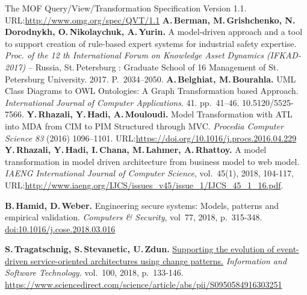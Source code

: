 \documentclass[runningheads]{llncs}
\begin{document}
\begin{thebibliography}{11}
 The MOF Query/View/Transformation Specification Version 1.1. URL:\url{http://www.omg.org/spec/QVT/1.1}
 \textbf{A.\,Berman, M.\,Grishchenko, N.\,Dorodnykh, O.\,Nikolaychuk, A.\,Yurin.} A model-driven approach and a tool to support creation of rule-based expert systems for industrial safety expertise. \emph{Proc. of the 12 th International Forum on Knowledge Asset Dynamics (IFKAD-2017)} -- Russia, St.\,Petersburg : Graduate School of 16 Management of St.\,Petersburg University.  2017.  P.~2034--2050.
 \textbf{A.\,Belghiat, M.\,Bourahla.} UML Class Diagrams to OWL Ontologies: A Graph Transformation based Approach. \emph{International Journal of Computer Applications}. 41. pp.~41--46. 10.5120/5525-7566.
\textbf{Y.\,Rhazali, Y.\,Hadi, A.\,Mouloudi.} Model Transformation with ATL into MDA from CIM to PIM Structured through MVC. \emph{Procedia Computer Science 83} (2016) 1096–1101. URL:\url{https://doi.org/10.1016/j.procs.2016.04.229}
\textbf{Y.\,Rhazali, Y.\,Hadi, I.\,Chana, M.\,Lahmer, A.\,Rhattoy.} A model
transformation in model driven architecture from business model to web
model. \emph{IAENG International Journal of Computer Science}, vol.~45(1), 2018, 104-117, URL:\url{http://www.iaeng.org/IJCS/issues_v45/issue_1/IJCS_45_1_16.pdf}.

\textbf{B.\,Hamid, D.\,Weber.} Engineering secure systems: Models, patterns
and empirical validation. \emph{Computers \& Security},  vol~77, 2018, p.~315-348.
\href{https://www.sciencedirect.com/science/article/pii/S0167404818303043}{doi:10.1016/j.cose.2018.03.016}


\textbf{S.\,Tragatschnig, S.\,Stevanetic, U.\,Zdun.} \href{https://www.sciencedirect.com/science/article/abs/pii/S0950584916303251}{Supporting the
evolution of event-driven service-oriented architectures using change
patterns.} \emph{Information and Software Technology.} vol.~100, 2018, p.~133-146. \href{doi:10.1016/j.infsof.2018.04.005}{https://www.sciencedirect.com/science/article/abs/pii/S0950584916303251}



\end{thebibliography}
\end{document}

